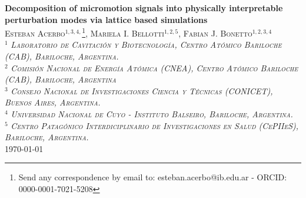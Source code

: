 \documentclass[english, 10pt, a4paper]{article}
\begin{document}
\begin{center}
 \centering
 {\LARGE\bfseries Decomposition of micromotion signals into physically interpretable perturbation modes via lattice based simulations}\\
 \textsc{Esteban Acerbo$^{1,3,4,}$\footnote[1]{Send any correspondence by email to: esteban.acerbo@ib.edu.ar - ORCID: 0000-0001-7021-5208}, Mariela I. Bellotti$^{1,2,5}$, Fabian J. Bonetto$^{1,2,3,4}$}\\
  \textsc{\small{$^1$ \textit{Laboratorio de Cavitación y Biotecnología, Centro Atómico Bariloche (CAB), Bariloche, Argentina.}\\$^2$ \textit{Comisión Nacional de Energía Atómica (CNEA), Centro Atómico Bariloche (CAB), Bariloche, Argentina}\\$^3$ \textit{Consejo Nacional de Investigaciones Ciencia y Técnicas (CONICET), Buenos Aires, Argentina.}\\$^4$ \textit{Universidad Nacional de Cuyo - Instituto Balseiro, Bariloche, Argentina.}}\\$^5$ \textit{Centro Patagónico Interdiciplinario de Investigaciones en Salud (CePIIeS), Bariloche, Argentina.}} \\[0.5cm]
 {\normalsize \today}\\[1cm]
\end{center}
 \begin{abstract}
  \noindent
Confluent cell monolayers over electrodes exhibit continuous impedance fluctuations that encode morphological and mechanical information at sub-second timescales, driven by lateral displacements, tight-junction remodeling, and biophysical parameter space heterogeneity. Decomposing these fluctuations into their constituent physical mechanisms remains an open problem, as each time step provides only two scalar observables while the underlying state space is high-dimensional. This work addresses the decomposition through physically parameterized lattice-based simulation libraries built on a finite-difference model sharing the Giaever and Keese analytical model parametrization. Four perturbation libraries were computed, representing electrode-monolayer relative movement, subcellular tight-junction geometry modification, collective brick-wall rearrangement, and biophysical parameter microperturbations. Together, these libraries cover the experimental phase space for four physiological states: cell seeding, confluence, electrical wound healing, and post-healing confluence. Two reconstruction algorithms were evaluated: a greedy nearest-prototype method that assigns one mode per library per time step by sequentially minimizing the running residual, and a sparse Viterbi algorithm that enforces smooth state trajectories at the cost of fit quality. Both produce physically interpretable, non-degenerate state sequences for each experimental electrode.
\end{abstract}
\end{document}
